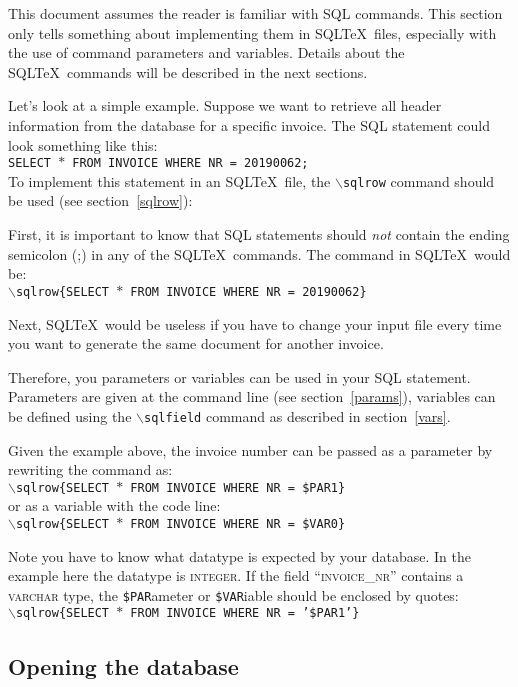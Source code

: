\documentclass{article}
\newcommand{\bs}{\ensuremath{\backslash}}
\newcommand{\vs}{\vspace{3mm}}
\begin{document}
This document assumes the reader is familiar with SQL commands. This section only tells something about
implementing them in SQL\TeX\ files, especially with the use of command parameters and variables.
Details about the SQL\TeX\ commands will be described in the next sections.

\vs

Let's look at a simple example. Suppose we want to retrieve all header information from the database
for a specific invoice. The SQL statement could look something like this: \\
\texttt{SELECT $\ast$ FROM INVOICE WHERE NR = 20190062;}\\
To implement this statement in an SQL\TeX\ file, the \texttt{\bs sqlrow} command should be used (see
section~\ref{sqlrow}):

First, it is important to know that SQL statements should \textit{not} contain the ending semicolon (;) in
any of the SQL\TeX\ commands. The command in SQL\TeX\ would be:\\
\texttt{\bs sqlrow\{SELECT $\ast$ FROM INVOICE WHERE NR = 20190062\}}

Next, SQL\TeX\ would be useless if you have to change your input file every time you want to generate
the same document for another invoice.

\vs

Therefore, you parameters or variables can be used in your SQL statement. Parameters are given at the command
line (see section~\ref{params}), variables can be defined using the \texttt{\bs sqlfield} command as
described in section~\ref{vars}.

Given the example above, the invoice number can be passed as a parameter by rewriting the command as: \\
\texttt{\bs sqlrow\{SELECT $\ast$ FROM INVOICE WHERE NR = \$PAR1\}} \\
or as a variable with the code line: \\
\texttt{\bs sqlrow\{SELECT $\ast$ FROM INVOICE WHERE NR = \$VAR0\}}

Note you have to know what datatype is expected by your database. In the example here the datatype is
\textsc{integer}. If the field ``\textsc{invoice\_nr}'' contains a \textsc{varchar} type, the
\texttt{\$PAR}ameter or \texttt{\$VAR}iable should be enclosed by quotes: \\
\texttt{\bs sqlrow\{SELECT $\ast$ FROM INVOICE WHERE NR = '\$PAR1'\}}

\subsection{Opening the database}\label{opendb}
\end{document}
